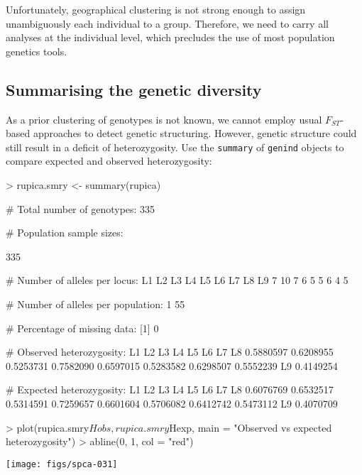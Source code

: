 \documentclass{article}
\begin{document}
Unfortunately, geographical clustering is not strong enough to assign unambiguously each individual to a group.
Therefore, we need to carry all analyses at the individual level, which precludes the use of most
population genetics tools.




\subsection{Summarising the genetic diversity}
As a prior clustering of genotypes is not known, we cannot employ usual
$F_{ST}$-based approaches to detect genetic structuring.
However, genetic structure could still result in a deficit of
heterozygosity.
Use the \texttt{summary} of \texttt{genind} objects to compare expected and
observed heterozygosity:
\begin{Schunk}
\begin{Sinput}
> rupica.smry <- summary(rupica)
\end{Sinput}
\begin{Soutput}
 # Total number of genotypes:  335 

 # Population sample sizes:  
    
335 

 # Number of alleles per locus:  
L1 L2 L3 L4 L5 L6 L7 L8 L9 
 7 10  7  6  5  5  6  4  5 

 # Number of alleles per population:  
 1 
55 

 # Percentage of missing data:  
[1] 0

 # Observed heterozygosity:  
       L1        L2        L3        L4        L5        L6        L7        L8 
0.5880597 0.6208955 0.5253731 0.7582090 0.6597015 0.5283582 0.6298507 0.5552239 
       L9 
0.4149254 

 # Expected heterozygosity:  
       L1        L2        L3        L4        L5        L6        L7        L8 
0.6076769 0.6532517 0.5314591 0.7259657 0.6601604 0.5706082 0.6412742 0.5473112 
       L9 
0.4070709 
\end{Soutput}
\begin{Sinput}
> plot(rupica.smry$Hobs, rupica.smry$Hexp, main = "Observed vs expected heterozygosity")
> abline(0, 1, col = "red")
\end{Sinput}
\end{Schunk}
\texttt{[image: figs/spca-031]}
\end{document}
